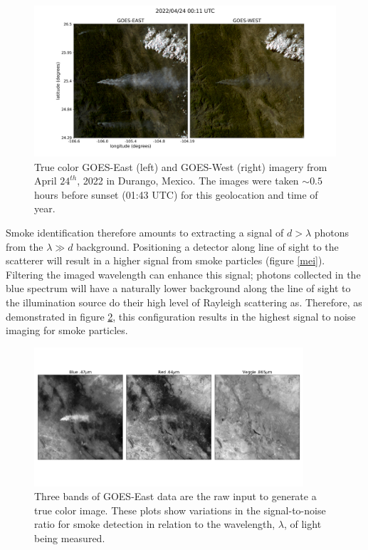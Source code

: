 \documentclass{article}
\begin{document}
\begin{figure}
    \centering
    \includegraphics[width=12cm]{figures/G16_v_G17.png}
    \caption{True color GOES-East (left) and GOES-West (right) imagery from April \(24^{th}\), 2022 in Durango, Mexico. The images were taken \(\sim0.5\) hours before sunset (01:43 UTC) for this geolocation and time of year.}\label{16_vs_17}
\end{figure}

Smoke identification therefore amounts to extracting a signal of \(d > \lambda\) photons from the \(\lambda \gg d\) background. Positioning a detector along line of sight to the scatterer will result in a higher signal from smoke particles (figure \ref{mei}). Filtering the imaged wavelength can enhance this signal; photons collected in the blue spectrum will have a naturally lower background along the line of sight to the illumination source do their high level of Rayleigh scattering as. Therefore, as demonstrated in figure \ref{bands}, this configuration results in the highest signal to noise imaging for smoke particles.   

\begin{figure}
    \centering
    \includegraphics[width=10cm]{figures/GOES16_bands.png}
    \caption{Three bands of GOES-East data are the raw input to generate a true color image. These plots show variations in the signal-to-noise ratio for smoke detection in relation to the wavelength, \(\lambda\), of light being measured.}\label{bands}
\end{figure}
\end{document}
